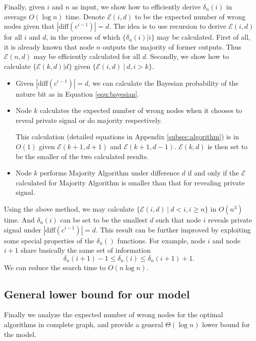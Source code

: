 \documentclass[a4paper,UKenglish]{lipics}
\theoremstyle{definition}
\newcommand{\diff}{\text{diff}}
\begin{document}
Finally, given $i$ and $n$ as input, we show how to efficiently derive $\delta_n(i)$ in average $O(\log n)$ time. 
Denote $\mathcal{E}(i,d)$ to be the expected number of wrong nodes given that $|\diff(c^{i-1})| = d$. 
The idea is to use recursion to derive $\mathcal{E}(i,d)$ for all $i$ and $d$, in the process of which $\{\delta_n(i)|i\}$ may be calculated.
First of all, it is already known that node $n$ outputs the majority of former outputs.
Thus $\mathcal{E}(n,d)$ may be efficiently calculated for all $d$.
Secondly, we show how to calculate $\{\mathcal{E}(k,d)|d\}$ given $\{\mathcal{E}(i,d)~|~d, i > k\}$.
\begin{itemize}
\item Given $|\diff(c^{i-1})| = d$, we can calculate the Bayesian probability of the nature bit as in Equation \eqref{equ:bayesian}.
\item Node $k$ calculates the expected number of wrong nodes when it chooses to reveal private signal or do majority respectively.
	 
	This calculation (detailed equations in Appendix \ref{subsec:algorithm}) is in $O(1)$ given $\mathcal{E}(k+1,d+1)$ and $\mathcal{E}(k+1,d-1)$.
	$\mathcal{E}(k,d)$ is then set to be the smaller of the two calculated results. 
\item Node $k$ performs Majority Algorithm under difference $d$ if and only if the $\mathcal{E}$ calculated for Majority Algorithm is smaller than that for revealing private signal.
\end{itemize}
Using the above method, we may calculate $\{\mathcal{E}(i,d)~|~d < i, i \ge n\}$ in $O(n^3)$ time.
And $\delta_n(i)$ can be set to be the smallest $d$ such that node $i$ reveals private signal under $|\diff(c^{i-1})| = d$.
This result can be further improved by exploiting some special properties of the $\delta_n()$ functions.
For example, node $i$ and node $i+1$ share basically the same set of information
\begin{equation}
\label{equ:bound3}
\delta_n(i+1)-1\le \delta_n(i)\le \delta_n(i+1)+1.
\end{equation}
We can reduce the search time to $O(n\log n)$.


\subsection{General lower bound for our model}
Finally we analyze the expected number of wrong nodes for the optimal algorithms in complete graph, 
	and provide a general $\Theta(\log n)$ lower bound for the model.
	
\end{document}
